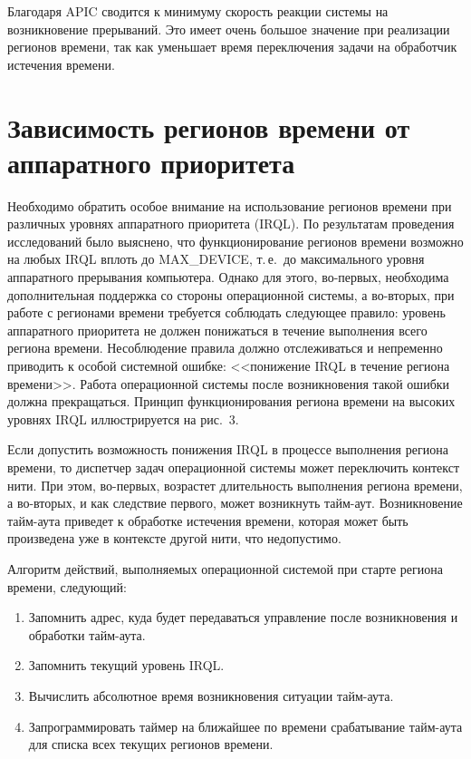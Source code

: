 \begin{multicols}{2}
   Благодаря APIC сводится к минимуму скорость реакции системы на возникновение
прерываний. Это имеет очень большое значение при реализации регионов времени, так как
уменьшает время переключения задачи на обработчик истечения вре\-мени.

\section{Зависимость регионов времени от аппаратного приоритета}



   
   Необходимо обратить особое внимание на использование регионов времени при различных
уровнях аппаратного приоритета (IRQL). По результатам проведения исследований было
выяснено, что функционирование регионов времени возможно на любых IRQL вплоть до
MAX\_DEVICE, т.\,е.\ до максимального уровня аппаратного прерывания компьютера. Однако
для этого, во-первых, необходима дополнительная поддержка со стороны операционной системы,
а во-вторых, при работе с регионами времени требуется соблюдать сле\-ду\-ющее правило: уровень
аппаратного приоритета не должен понижаться в течение выполнения всего региона времени.
Несоблюдение правила должно отслеживаться и непременно приводить к особой системной
ошибке: <<понижение IRQL в течение региона времени>>. Работа операционной системы после
возникновения такой ошибки должна прекращаться. Принцип функционирования региона
времени на высоких уровнях IRQL иллюстрируется на рис.~3.

   Если допустить возможность понижения IRQL в процессе выполнения региона времени, то
диспетчер задач операционной системы может переключить контекст нити. При этом, во-первых,
возрастет длительность выполнения региона времени, а во-вторых, и как следствие первого, может
возникнуть тайм-аут. Возникновение тайм-аута приведет к обработке истечения времени, которая
может быть произведена уже в контексте другой нити, что недопустимо.


   Алгоритм действий, выполняемых операционной системой при старте региона времени,
сле\-ду\-ющий:
   \begin{enumerate}[1.]
\item Запомнить адрес, куда будет передаваться управ\-ле\-ние после возникновения и
обработки тайм-аута.
\item Запомнить текущий уровень IRQL.
\item Вычислить абсолютное время возникновения ситуации тайм-аута.
\item Запрограммировать таймер на ближайшее по времени срабатывание тайм-аута для
списка всех текущих регионов времени.
\end{enumerate}


\end{multicols}
